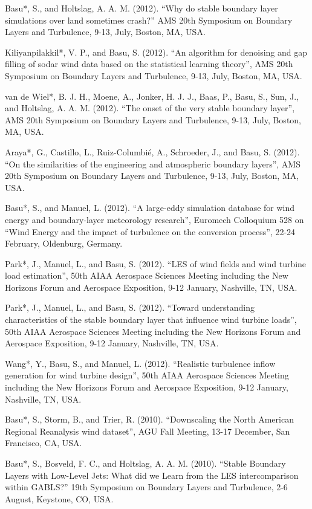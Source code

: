 \begin{etaremune}[topsep=0pt,itemsep=0pt,partopsep=0pt,parsep=0pt]
\item Basu*, S., and Holtslag, A. A. M. (2012). ``Why do stable boundary layer simulations over land sometimes crash?'' AMS 20th Symposium on Boundary Layers and Turbulence, 9-13, July, Boston, MA, USA.
\item Kiliyanpilakkil*, V. P., and Basu, S. (2012). ``An algorithm for denoising and gap filling of sodar wind data based on the statistical learning theory'', AMS 20th Symposium on Boundary Layers and Turbulence, 9-13, July, Boston, MA, USA.
\item van de Wiel*, B. J. H., Moene, A., Jonker, H. J. J., Baas, P., Basu, S., Sun, J., and Holtslag, A. A. M. (2012). ``The onset of the very stable boundary layer'', AMS 20th Symposium on Boundary Layers and Turbulence, 9-13, July, Boston, MA, USA.
\item Araya*, G., Castillo, L., Ruiz-Columbi\'{e}, A., Schroeder, J., and Basu, S. (2012). ``On the similarities of the engineering and atmospheric boundary layers'', AMS 20th Symposium on Boundary Layers and Turbulence, 9-13, July, Boston, MA, USA.
\item Basu*, S., and Manuel, L. (2012). ``A large-eddy simulation database for wind energy and boundary-layer meteorology research'', Euromech Colloquium 528 on ``Wind Energy and the impact of turbulence on the conversion process'', 22-24 February, Oldenburg, Germany.
\item Park*, J., Manuel, L., and Basu, S. (2012). ``LES of wind fields and wind turbine load estimation'', 50th AIAA Aerospace Sciences Meeting including the New Horizons Forum and Aerospace Exposition, 9-12 January, Nashville, TN, USA.
\item Park*, J., Manuel, L., and Basu, S. (2012). ``Toward understanding characteristics of the stable boundary layer that influence wind turbine loads'', 50th AIAA Aerospace Sciences Meeting including the New Horizons Forum and Aerospace Exposition, 9-12 January, Nashville, TN, USA.
\item Wang*, Y., Basu, S., and Manuel, L. (2012). ``Realistic turbulence inflow generation for wind turbine design'',  50th AIAA Aerospace Sciences Meeting including the New Horizons Forum and Aerospace Exposition, 9-12 January, Nashville, TN, USA.
\item Basu*, S., Storm, B., and Trier, R. (2010). ``Downscaling the North American Regional Reanalysis wind dataset'', AGU Fall Meeting, 13-17 December, San Francisco, CA, USA. 
\item Basu*, S., Bosveld, F. C., and Holtslag, A. A. M. (2010). ``Stable Boundary Layers with Low-Level Jets: What did we Learn from the LES intercomparison within GABLS?'' 19th Symposium on Boundary Layers and Turbulence, 2-6 August, Keystone, CO, USA.

\end{etaremune}
